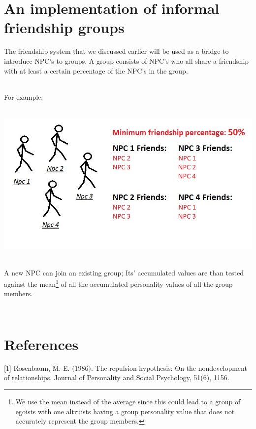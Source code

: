 \documentclass[11pt]{article} %
\begin{document}
\newpage
\section{An implementation of informal friendship groups}
The friendship system that we discussed earlier will be used as a bridge to introduce NPC's to groups. A group consists of NPC's who all share a friendship with at least a certain percentage of the NPC's in the group. 

~\\
For example:

~\\
\includegraphics[scale=0.7]{group} 


~\\
A new NPC can join an existing group; Its' accumulated values are than tested against the mean\footnote{We use the mean instead of the average since this could lead to a group of egoists with one altruists having a group personality value that does not accurately represent the group members.} of all the accumulated personality values of all the group members.

~\\


\newpage
\section{References}
[1] Rosenbaum, M. E. (1986). The repulsion hypothesis: On the nondevelopment of relationships. Journal of Personality and Social Psychology, 51(6), 1156.




\end{document}
